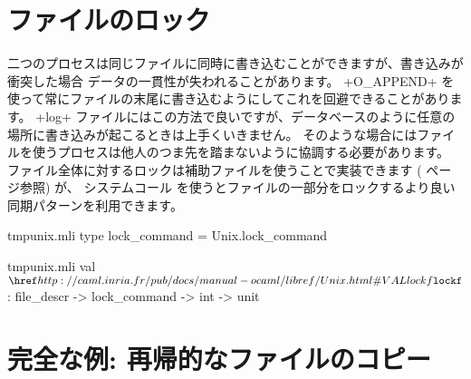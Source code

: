 \section{ファイルのロック}

二つのプロセスは同じファイルに同時に書き込むことができますが、書き込みが衝突した場合
データの一貫性が失われることがあります。
\ml+O_APPEND+ を使って常にファイルの末尾に書き込むようにしてこれを回避できることがあります。
\ml+log+ ファイルにはこの方法で良いですが、データベースのように任意の場所に書き込みが起こるときは上手くいきません。
そのような場合にはファイルを使うプロセスは他人のつま先を踏まないように協調する必要があります。
ファイル全体に対するロックは補助ファイルを使うことで実装できます (\pageref{page/lock} ページ参照) が、
システムコール  を使うとファイルの一部分をロックするより良い同期パターンを利用できます。
%
\begin{codefile}{tmpunix.mli}
type lock_command = Unix.lock_command
\end{codefile}
%
\begin{listingcodefile}{tmpunix.mli}
 val $\libvalue{Unix}{lockf}$ : file_descr -> lock_command -> int -> unit
\end{listingcodefile}


\section{\label{sec/copyrec}完全な例: 再帰的なファイルのコピー}

